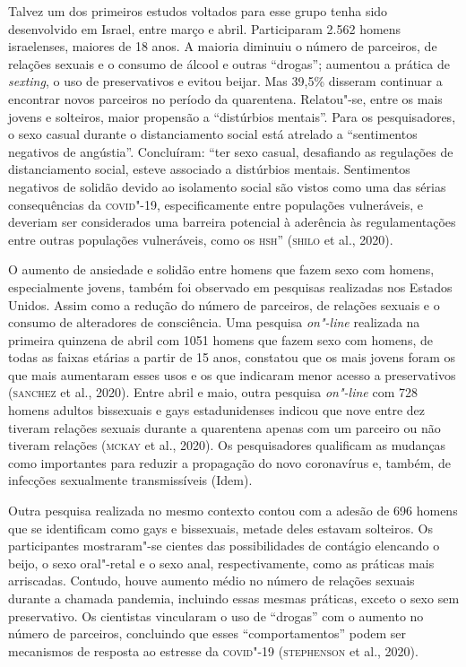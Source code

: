 Talvez um dos primeiros estudos voltados para esse grupo tenha sido
desenvolvido em Israel, entre março e abril. Participaram 2.562 homens
israelenses, maiores de 18 anos. A maioria diminuiu o número de
parceiros, de relações sexuais e o consumo de álcool e outras
``drogas''; aumentou a prática de \emph{sexting}, o uso de preservativos
e evitou beijar. Mas 39,5\% disseram continuar a encontrar novos
parceiros no período da quarentena. Relatou"-se, entre os mais jovens e
solteiros, maior propensão a ``distúrbios mentais''. Para os
pesquisadores, o sexo casual durante o distanciamento social está
atrelado a ``sentimentos negativos de angústia''. Concluíram: ``ter sexo
casual, desafiando as regulações de distanciamento social, esteve
associado a distúrbios mentais. Sentimentos negativos de solidão devido
ao isolamento social são vistos como uma das sérias consequências da
\textsc{covid}"-19, especificamente entre populações vulneráveis, e deveriam ser
considerados uma barreira potencial à aderência às regulamentações entre
outras populações vulneráveis, como os \textsc{hsh}'' (\textsc{shilo} et al., 2020).

O aumento de ansiedade e solidão entre homens que fazem sexo com homens,
especialmente jovens, também foi observado em pesquisas realizadas nos
Estados Unidos. Assim como a redução do número de parceiros, de relações
sexuais e o consumo de alteradores de consciência. Uma pesquisa
\emph{on"-line} realizada na primeira quinzena de abril com 1051 homens
que fazem sexo com homens, de todas as faixas etárias a partir de 15
anos, constatou que os mais jovens foram os que mais aumentaram esses
usos e os que indicaram menor acesso a preservativos (\textsc{sanchez} et al.,
2020). Entre abril e maio, outra pesquisa \emph{on"-line} com 728 homens
adultos bissexuais e gays estadunidenses indicou que nove entre dez
tiveram relações sexuais durante a quarentena apenas com um parceiro ou
não tiveram relações (\textsc{mckay} et al., 2020). Os pesquisadores qualificam
as mudanças como importantes para reduzir a propagação do novo
coronavírus e, também, de infecções sexualmente transmissíveis (Idem).

Outra pesquisa realizada no mesmo contexto contou com a adesão de 696
homens que se identificam como gays e bissexuais, metade deles estavam
solteiros. Os participantes mostraram"-se cientes das possibilidades de
contágio elencando o beijo, o sexo oral"-retal e o sexo anal,
respectivamente, como as práticas mais arriscadas. Contudo, houve
aumento médio no número de relações sexuais durante a chamada pandemia,
incluindo essas mesmas práticas, exceto o sexo sem preservativo. Os
cientistas vincularam o uso de ``drogas'' com o aumento no número de
parceiros, concluindo que esses ``comportamentos'' podem ser mecanismos
de resposta ao estresse da \textsc{covid}"-19 (\textsc{stephenson} et al., 2020).

